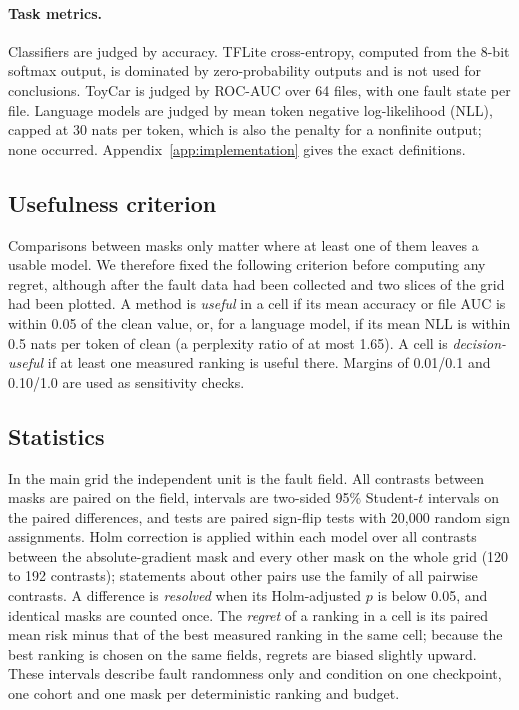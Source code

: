 \paragraph{Task metrics.} Classifiers are judged by accuracy. TFLite cross-entropy, computed from the 8-bit softmax output, is dominated by zero-probability outputs and is not used for conclusions. ToyCar is judged by ROC-AUC over 64 files, with one fault state per file. Language models are judged by mean token negative log-likelihood (NLL), capped at 30 nats per token, which is also the penalty for a nonfinite output; none occurred. Appendix~\ref{app:implementation} gives the exact definitions.

\subsection{Usefulness criterion}
Comparisons between masks only matter where at least one of them leaves a usable model. We therefore fixed the following criterion before computing any regret, although after the fault data had been collected and two slices of the grid had been plotted. A method is \emph{useful} in a cell if its mean accuracy or file AUC is within 0.05 of the clean value, or, for a language model, if its mean NLL is within 0.5 nats per token of clean (a perplexity ratio of at most 1.65). A cell is \emph{decision-useful} if at least one measured ranking is useful there. Margins of 0.01/0.1 and 0.10/1.0 are used as sensitivity checks.

\subsection{Statistics}
In the main grid the independent unit is the fault field. All contrasts between masks are paired on the field, intervals are two-sided 95\% Student-$t$ intervals on the paired differences, and tests are paired sign-flip tests with 20,000 random sign assignments. Holm correction is applied within each model over all contrasts between the absolute-gradient mask and every other mask on the whole grid (120 to 192 contrasts); statements about other pairs use the family of all pairwise contrasts. A difference is \emph{resolved} when its Holm-adjusted $p$ is below 0.05, and identical masks are counted once. The \emph{regret} of a ranking in a cell is its paired mean risk minus that of the best measured ranking in the same cell; because the best ranking is chosen on the same fields, regrets are biased slightly upward. These intervals describe fault randomness only and condition on one checkpoint, one cohort and one mask per deterministic ranking and budget.


